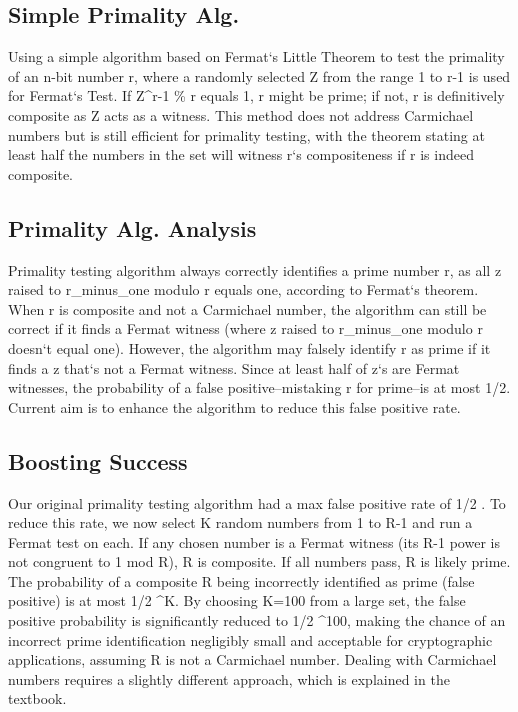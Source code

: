 \subsection*{Simple Primality Alg.}
Using a simple algorithm based on Fermat`s Little Theorem to test the primality of an n-bit number r, where a randomly selected Z from the range 1 to r-1 is used for Fermat`s Test.
If Z\textasciicircum{}r-1 \% r equals 1, r might be prime; if not, r is definitively composite as Z acts as a witness.
This method does not address Carmichael numbers but is still efficient for primality testing, with the theorem stating at least half the numbers in the set will witness r`s compositeness if r is indeed composite.

\subsection*{Primality Alg.
Analysis}
Primality testing algorithm always correctly identifies a prime number r, as all z raised to r\_minus\_one modulo r equals one, according to Fermat`s theorem.
When r is composite and not a Carmichael number, the algorithm can still be correct if it finds a Fermat witness (where z raised to r\_minus\_one modulo r doesn`t equal one).
However, the algorithm may falsely identify r as prime if it finds a z that`s not a Fermat witness.
Since at least half of z`s are Fermat witnesses, the probability of a false positive--mistaking r for prime--is at most 1/2.
Current aim is to enhance the algorithm to reduce this false positive rate.

\subsection*{Boosting Success}
Our original primality testing algorithm had a max false positive rate of  1/2 .
To reduce this rate, we now select K random numbers from 1 to R-1 and run a Fermat test on each.
If any chosen number is a Fermat witness (its R-1 power is not congruent to 1 mod R), R is composite.
If all numbers pass, R is likely prime.
The probability of a composite R being incorrectly identified as prime (false positive) is at most  1/2 \textasciicircum{}K\@.
By choosing K=100 from a large set, the false positive probability is significantly reduced to  1/2 \textasciicircum{}100, making the chance of an incorrect prime identification negligibly small and acceptable for cryptographic applications, assuming R is not a Carmichael number.
Dealing with Carmichael numbers requires a slightly different approach, which is explained in the textbook.

